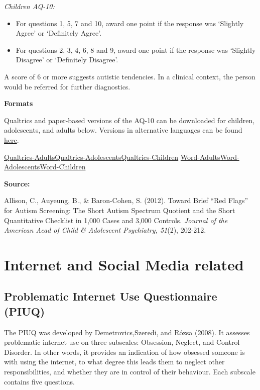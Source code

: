 \documentclass[
]{book}
\providecommand{\tightlist}{%
  \setlength{\itemsep}{0pt}\setlength{\parskip}{0pt}}
\begin{document}
\emph{Children AQ-10:}

\begin{itemize}
\tightlist
\item
  For questions 1, 5, 7 and 10, award one point if the response was `Slightly Agree' or `Definitely Agree'.
\item
  For questions 2, 3, 4, 6, 8 and 9, award one point if the response was `Slightly Disagree' or `Definitely Disagree'.
\end{itemize}

A score of 6 or more suggests autistic tendencies. In a clinical context, the person would be referred for further diagnostics.

\textbf{Formats}

Qualtrics and paper-based versions of the AQ-10 can be downloaded for children, adolescents, and adults below. Versions in alternative languages can be found \href{https://www.autismresearchcentre.com/arc_tests}{here}.

\href{link}{Qualtrics-Adults}\textbar{}\href{link}{Qualtrics-Adolescents}\textbar{}\href{link}{Qualtrics-Children}
\href{link}{Word-Adults}\textbar{}\href{link}{Word-Adolescents}\textbar{}\href{link}{Word-Children}

\textbf{Source:}

Allison, C., Auyeung, B., \& Baron-Cohen, S. (2012). Toward Brief ``Red Flags'' for Autism Screening: The Short Autism Spectrum Quotient and the Short Quantitative Checklist in 1,000 Cases and 3,000 Controls. \emph{Journal of the American Acad of Child \& Adolescent Psychiatry, 51}(2), 202-212.

\hypertarget{internet-and-social-media-related}{%
\section{Internet and Social Media related}\label{internet-and-social-media-related}}

\hypertarget{problematic-internet-use-questionnaire-piuq}{%
\subsection{Problematic Internet Use Questionnaire (PIUQ)}\label{problematic-internet-use-questionnaire-piuq}}

The PIUQ was developed by Demetrovics,Szeredi, and Rózsa (2008). It assesses problematic internet use on three subscales: Obsession, Neglect, and Control Disorder. In other words, it provides an indication of how obsessed someone is with using the internet, to what degree this leads them to neglect other responsibilities, and whether they are in control of their behaviour. Each subscale contains five questions.
\end{document}
